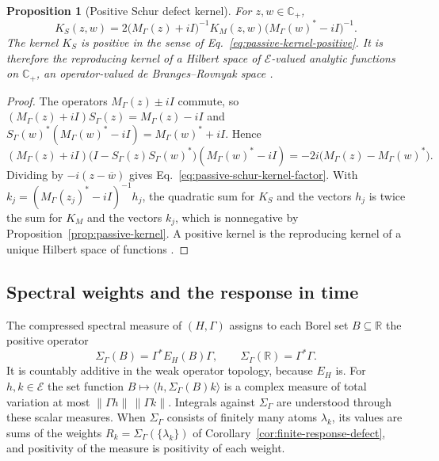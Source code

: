 \documentclass[11pt]{article}
\newtheorem{proposition}{Proposition}[section]
\theoremstyle{definition}
\newcommand{\C}{\mathbb C}
\newcommand{\R}{\mathbb R}
\begin{document}
\begin{proposition}[Positive Schur defect kernel]
\label{prop:passive-schur-kernel}
For $z,w\in\C_+$,
\begin{equation}
 K_S(z,w)=2\bigl(M_\Gamma(z)+iI\bigr)^{-1}K_M(z,w)\bigl(M_\Gamma(w)^*-iI\bigr)^{-1}.
 \label{eq:passive-schur-kernel-factor}
\end{equation}
The kernel $K_S$ is positive in the sense of Eq.~\eqref{eq:passive-kernel-positive}. It is therefore the reproducing kernel of a Hilbert space of $\mathcal E$-valued analytic functions on $\C_+$, an operator-valued de Branges--Rovnyak space \cite{Aronszajn,deBrangesRovnyak}.
\end{proposition}
\begin{proof}
The operators $M_\Gamma(z)\pm iI$ commute, so $(M_\Gamma(z)+iI)S_\Gamma(z)=M_\Gamma(z)-iI$ and $S_\Gamma(w)^*(M_\Gamma(w)^*-iI)=M_\Gamma(w)^*+iI$. Hence
\[
 (M_\Gamma(z)+iI)\bigl(I-S_\Gamma(z)S_\Gamma(w)^*\bigr)(M_\Gamma(w)^*-iI)
   =-2i\bigl(M_\Gamma(z)-M_\Gamma(w)^*\bigr).
\]
Dividing by $-i(z-\overline w)$ gives Eq.~\eqref{eq:passive-schur-kernel-factor}. With $k_j=(M_\Gamma(z_j)^*-iI)^{-1}h_j$, the quadratic sum for $K_S$ and the vectors $h_j$ is twice the sum for $K_M$ and the vectors $k_j$, which is nonnegative by Proposition~\ref{prop:passive-kernel}. A positive kernel is the reproducing kernel of a unique Hilbert space of functions \cite{Aronszajn}.
\end{proof}

\subsection{Spectral weights and the response in time}
\label{subsec:passive-spectral}

The compressed spectral measure of $(H,\Gamma)$ assigns to each Borel set $B\subseteq\R$ the positive operator
\begin{equation}
 \Sigma_\Gamma(B)=\Gamma^*E_H(B)\Gamma ,\qquad \Sigma_\Gamma(\R)=\Gamma^*\Gamma .
 \label{eq:passive-spectral-measure}
\end{equation}
It is countably additive in the weak operator topology, because $E_H$ is. For $h,k\in\mathcal E$ the set function $B\mapsto\langle h,\Sigma_\Gamma(B)k\rangle$ is a complex measure of total variation at most $\|\Gamma h\|\,\|\Gamma k\|$. Integrals against $\Sigma_\Gamma$ are understood through these scalar measures. When $\Sigma_\Gamma$ consists of finitely many atoms $\lambda_k$, its values are sums of the weights $R_k=\Sigma_\Gamma(\{\lambda_k\})$ of Corollary~\ref{cor:finite-response-defect}, and positivity of the measure is positivity of each weight.
\end{document}
